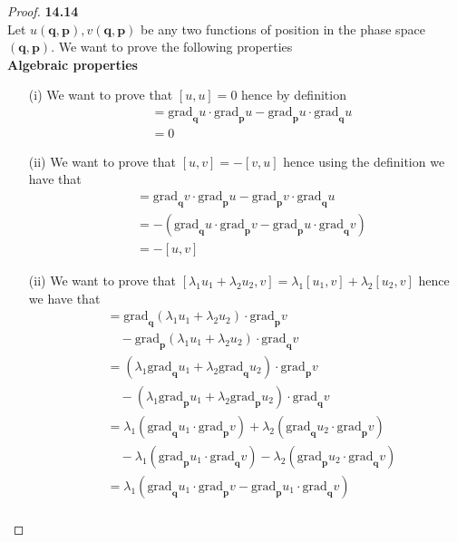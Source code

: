 \documentclass[11pt]{article}
\newcommand{\ngrad}[1]{\text{grad}_{\bm{#1}}}
\theoremstyle{definition}
\begin{document}
\cleardoublepage
\begin{proof}{\textbf{14.14}}\\
    Let $u(\bm{q},\bm{p}),v(\bm{q},\bm{p})$ be any two functions of position
    in the phase space $(\bm{q},\bm{p})$. We want to prove the following
    properties\\
    \textbf{Algebraic properties}
    \begin{itemize}
        \item[(i)] We want to prove that $[u,u] = 0$ hence by definition
        \begin{align*}
            [u,u] &= \ngrad{q}u \cdot \ngrad{p}u - \ngrad{p}u \cdot \ngrad{q}u\\
                &= 0 
        \end{align*}
        \item[(ii)] We want to prove that $[u,v] = -[v,u]$ hence using
        the definition we have that
        \begin{align*}
            [v,u] &= \ngrad{q}v \cdot \ngrad{p}u - \ngrad{p}v \cdot \ngrad{q}u\\
                &= -(\ngrad{q}u \cdot \ngrad{p}v - \ngrad{p}u \cdot \ngrad{q}v)\\
                &= -[u,v]
        \end{align*}
        \item[(ii)] We want to prove that
        $[\lambda_1u_1 + \lambda_2 u_2,v] = \lambda_1[u_1, v] + \lambda_2[u_2, v]$
        hence we have that
        \begin{align*}
            [\lambda_1u_1 + \lambda_2 u_2,v]
                &= \ngrad{q}(\lambda_1u_1 + \lambda_2 u_2) \cdot \ngrad{p}v\\
                &\quad - \ngrad{p}(\lambda_1u_1 + \lambda_2 u_2) \cdot \ngrad{q}v\\
                &= (\lambda_1\ngrad{q}u_1 + \lambda_2 \ngrad{q}u_2) \cdot \ngrad{p}v\\
                &\quad - (\lambda_1\ngrad{p}u_1 + \lambda_2\ngrad{p}u_2)
                \cdot \ngrad{q}v\\
                &= \lambda_1(\ngrad{q}u_1\cdot\ngrad{p}v) + \lambda_2 (\ngrad{q}u_2\cdot\ngrad{p}v) \\
                &\quad - \lambda_1(\ngrad{p}u_1\cdot \ngrad{q}v) - \lambda_2(\ngrad{p}u_2\cdot \ngrad{q}v)\\
                &= \lambda_1(\ngrad{q}u_1\cdot\ngrad{p}v
                - \ngrad{p}u_1\cdot \ngrad{q}v)\\

\end{align*}
\end{itemize}
\end{proof}
\end{document}
